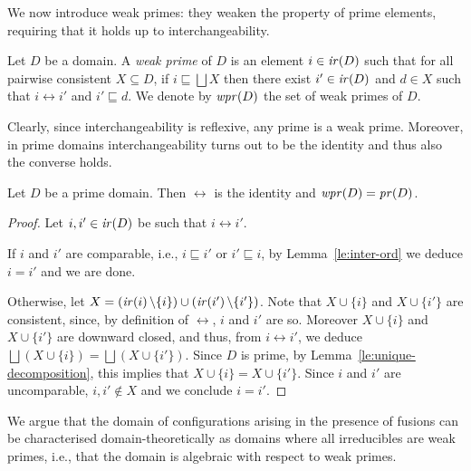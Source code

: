 We now introduce weak primes: they weaken the property
of prime elements, requiring that it holds up to
interchangeability.

\begin{definition}
  \label{de:weak-prime}
  Let $D$ be a domain. A \emph{weak prime} of $D$ is an element
  $i \in \mathop{\mathit{ir}({D})}$ such that for all pairwise consistent
  $X \subseteq D$, if $i \sqsubseteq \bigsqcup X$ then there exist
  $i' \in \mathop{\mathit{ir}({D})}$ and $d \in X$ such that $i \leftrightarrow i'$ and
  $i' \sqsubseteq d$. We denote by $\mathop{\mathit{wpr}({D})}$ the set of weak primes of
  $D$.
\end{definition}

Clearly, since interchangeability is reflexive, any prime is a weak
prime. Moreover, in prime domains interchangeability turns out to be
the identity and thus also the converse holds.

\begin{lemma}
  \label{le:interchange-id-pad}
  Let $D$ be a prime domain. Then $\leftrightarrow$ is the
  identity and $\mathop{\mathit{wpr}({D})} = \mathop{\mathit{pr}({D})}$.
\end{lemma}

\begin{proof}
  Let $i, i' \in \mathop{\mathit{ir}({D})}$ be such that $i \leftrightarrow i'$. 

  If $i$ and $i'$ are comparable, i.e., $i \sqsubseteq i'$ or
  $i' \sqsubseteq i$, by Lemma~\ref{le:inter-ord} we deduce
  $i = i'$ and we are done.

  Otherwise,
  let
  $X = (\mathop{\mathit{ir}({i})} \setminus \{i\}) \cup (\mathop{\mathit{ir}({i'})} \setminus \{i'\})$.
  Note that $X \cup \{ i \}$ and $X \cup \{ i' \}$ are consistent,
  since, by definition of $\leftrightarrow$, $i$ and $i'$ are so.
  Moreover $X \cup \{ i \}$ and $X \cup \{ i' \}$ are downward closed,
  and thus, from $i \leftrightarrow i'$, we deduce
  $\bigsqcup(X \cup \{ i \})= \bigsqcup(X \cup \{ i' \})$.  Since $D$
  is prime, by Lemma~\ref{le:unique-decomposition}, this
  implies that $X \cup \{ i \} = X \cup \{ i' \}$.
  Since $i$ and $i'$ are uncomparable,
  $i, i' \not\in X$ and we
  conclude $i=i'$.
\end{proof}


We argue that the domain of configurations arising in the presence of
fusions can be characterised domain-theoretically as {\wi} domains
  where all irreducibles are weak primes, i.e., that the domain is
algebraic with respect to weak primes.

